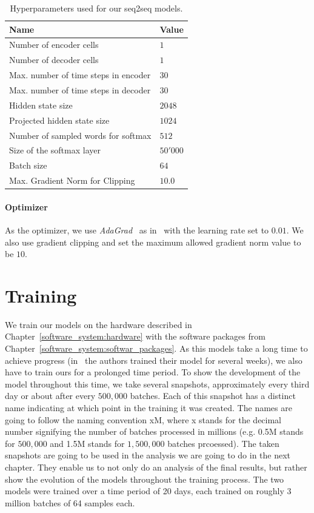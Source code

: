 \begin{table}[H]
	\centering
	\begin{adjustbox}{max width=\textwidth}
		\begin{tabular}{ll}
			\toprule
			Name & Value\\ \midrule
			Number of encoder cells & $1$\\
			Number of decoder cells & $1$\\
			Max. number of time steps in encoder & $30$\\
			Max. number of time steps in decoder & $30$\\
			Hidden state size & $2048$\\
			Projected hidden state size & $1024$\\
			Number of sampled words for softmax & $512$\\
			Size of the softmax layer & $50'000$\\
			Batch size & $64$\\
			Max. Gradient Norm for Clipping & $10.0$\\
			\bottomrule
		\end{tabular}
	\end{adjustbox}
	\caption{Hyperparameters used for our seq2seq models.}
	\label{methods:hyperparameters:table}
\end{table}

\paragraph{Optimizer} As the optimizer, we use \emph{AdaGrad}~\cite{Duchi:2011} as in~\cite{Vinyals:2015} with the learning rate set to $0.01$. We also use gradient clipping \cite{Pascanu:2013} and set the maximum allowed gradient norm value to be $10$.

\section{Training}
\label{methods:training}
We train our models on the hardware described in Chapter~\ref{software_system:hardware} with the software packages from Chapter~\ref{software_system:softwar_packages}. As this models take a long time to achieve progress (in~\cite{Vinyals:2015} the authors trained their model for several weeks), we also have to train ours for a prolonged time period. To show the development of the model throughout this time, we take several snapshots, approximately every third day or about after every $500,000$ batches. Each of this snapshot has a distinct name indicating at which point in the training it was created. The names are going to follow the naming convention xM, where x stands for the decimal number signifying the number of batches processed in millions (e.g. 0.5M stands for $500,000$ and 1.5M stands for $1,500,000$ batches prcoessed). The taken snapshots are going to be used in the analysis we are going to do in the next chapter. They enable us to not only do an analysis of the final results, but rather show the evolution of the models throughout the training process. The two models were trained over a time period of 20 days, each trained on roughly 3 million batches of 64 samples each.

